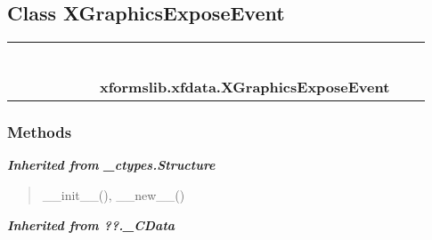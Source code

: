 
\subsection{Class XGraphicsExposeEvent}

    \label{xformslib:xfdata:XGraphicsExposeEvent}
\begin{tabular}{cccccccccc}
\multicolumn{2}{r}{\settowidth{\BCL}{object}\multirow{2}{\BCL}{object}}
&&
&&
&&
  \\\cline{3-3}
  &&\multicolumn{1}{c|}{}
&&
&&
&&
  \\
\multicolumn{4}{r}{\settowidth{\BCL}{??.\_CData}\multirow{2}{\BCL}{??.\_CData}}
&&
&&
  \\\cline{5-5}
  &&&&\multicolumn{1}{c|}{}
&&
&&
  \\
\multicolumn{6}{r}{\settowidth{\BCL}{\_ctypes.Structure}\multirow{2}{\BCL}{\_ctypes.Structure}}
&&
  \\\cline{7-7}
  &&&&&&\multicolumn{1}{c|}{}
&&
  \\
&&&&&&\multicolumn{2}{l}{\textbf{xformslib.xfdata.XGraphicsExposeEvent}}
\end{tabular}



  \subsubsection{Methods}


\large{\textbf{\textit{Inherited from \_ctypes.Structure}}}

\begin{quote}
\_\_init\_\_(), \_\_new\_\_()
\end{quote}

\large{\textbf{\textit{Inherited from ??.\_CData}}}

